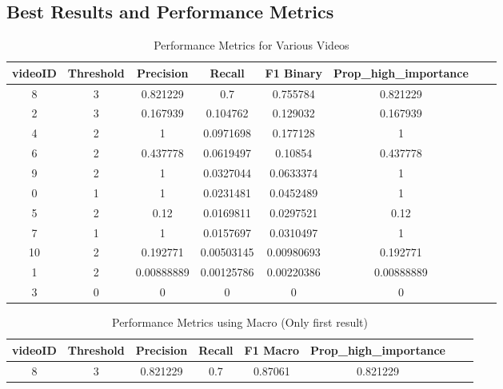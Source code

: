 \documentclass[conference]{IEEEtran}
\begin{document}
\subsection*{Best Results and Performance Metrics}
\begin{table}[H]

\begin{tabular}{|c|c|c|c|c|c|c|c|}
\hline
\textbf{videoID} & \textbf{Threshold} & \textbf{Precision} & \textbf{Recall} & \textbf{F1 Binary}  & \textbf{Prop\_high\_importance} \\
\hline
8 & 3 & 0.821229 & 0.7 & 0.755784  & 0.821229 \\
\hline
2 & 3 & 0.167939 & 0.104762 & 0.129032  & 0.167939 \\
\hline
4 & 2 & 1 & 0.0971698 & 0.177128  & 1 \\
\hline
6 & 2 & 0.437778 & 0.0619497 & 0.10854 & 0.437778 \\
\hline
9 & 2 & 1 & 0.0327044 & 0.0633374  & 1 \\
\hline
0 & 1 & 1 & 0.0231481 & 0.0452489  & 1 \\
\hline
5 & 2 & 0.12 & 0.0169811 & 0.0297521 & 0.12 \\
\hline
7 & 1 & 1 & 0.0157697 & 0.0310497  & 1 \\
\hline
10 & 2 & 0.192771 & 0.00503145 & 0.00980693  & 0.192771 \\
\hline
1 & 2 & 0.00888889 & 0.00125786 & 0.00220386 & 0.00888889 \\
\hline
3 & 0 & 0 & 0 & 0 & 0  \\
\hline
\end{tabular}
\caption{Performance Metrics for Various Videos}
\end{table}

\begin{table}[H]
\begin{tabular}{|c|c|c|c|c|c|c|c|}
\hline
\textbf{videoID} & \textbf{Threshold} & \textbf{Precision} & \textbf{Recall} & \textbf{F1 Macro} & \textbf{Prop\_high\_importance} \\
\hline
 8&3 &  0.821229 & 0.7 &        0.87061  &             0.821229   \\
\hline
\end{tabular}
\caption{Performance Metrics using Macro (Only first result)}
\end{table}
\end{document}
